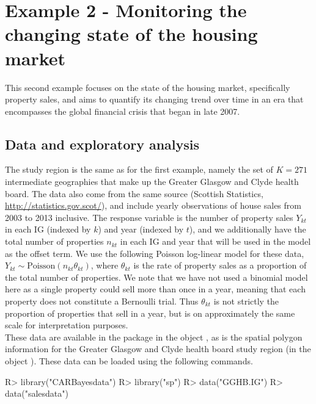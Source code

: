 \documentclass[article, nojss]{jss}
\begin{document}
\section{Example 2 - Monitoring the changing state of the housing market}\label{section6}
This second example focuses on the state of the housing market, specifically property sales, and aims to quantify its changing trend over time in an era that encompasses the global financial crisis that began in late 2007. 

\subsection{Data and exploratory analysis}
The study region is the same as for the first example, namely the set of $K=271$ intermediate geographies that make up the Greater Glasgow and Clyde health board. The data also come from the same source (Scottish Statistics, \url{http://statistics.gov.scot/}), and include yearly observations of house sales from 2003 to 2013 inclusive. The response variable is the number of property sales $Y_{kt}$ in each IG (indexed by $k$) and year (indexed by $t$), and we additionally have the total number of properties $n_{kt}$ in each IG and year that will be used in the model as the offset term. We use the following Poisson log-linear model for these data, $Y_{kt}\sim\mbox{Poisson}(n_{kt}\theta_{kt})$, where $\theta_{kt}$ is the rate of property sales as a proportion of the total number of properties. We note that we have not used a binomial model here as a single property could sell more than once in a year, meaning that each property does not constitute a Bernoulli trial. Thus $\theta_{kt}$ is not strictly the proportion of properties that sell in a year, but is on approximately the same scale for interpretation purposes.\\

These data are available in the  package in the object , as is the spatial polygon information for the Greater Glasgow and Clyde health board study region (in the object ). These data can be loaded using the following commands.



\begin{Schunk}
\begin{Sinput}
R>  library("CARBayesdata")
R>  library("sp")
R>  data("GGHB.IG")
R>  data("salesdata")
\end{Sinput}
\end{Schunk}
\end{document}

